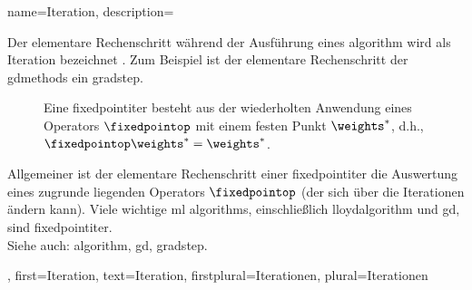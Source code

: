 {{{{
{
    name={Iteration},
    description={Der elementare Rechenschritt während der Ausführung eines 
                 \gls{algorithm} wird als Iteration bezeichnet \cite{Cormen:2022aa,KleinbergTardos2006}. 
                 Zum Beispiel ist der elementare Rechenschritt der \glspl{gdmethod} ein \gls{gradstep}. 
                 \begin{figure}[t]
                    \centering
                    \caption{Eine \gls{fixedpointiter} besteht aus der wiederholten Anwendung eines 
                    Operators $\fixedpointop$ mit einem festen Punkt $\weights^\ast$, d.h., 
                    $\fixedpointop\weights^\ast=\weights^\ast$.}
                 \end{figure} 
                 Allgemeiner ist der elementare Rechenschritt einer \gls{fixedpointiter} die Auswertung eines zugrunde liegenden Operators $\fixedpointop$ 
                 (der sich über die Iterationen ändern kann). Viele wichtige \gls{ml} \glspl{algorithm}, 
                 einschließlich \gls{lloydalgorithm} und \gls{gd}, sind \gls{fixedpointiter}.  \\ 
                 Siehe auch: \gls{algorithm}, \gls{gd}, \gls{gradstep}. 
    },
    first={Iteration},
    text={Iteration},
    firstplural={Iterationen},
    plural={Iterationen}
}

}}}}
